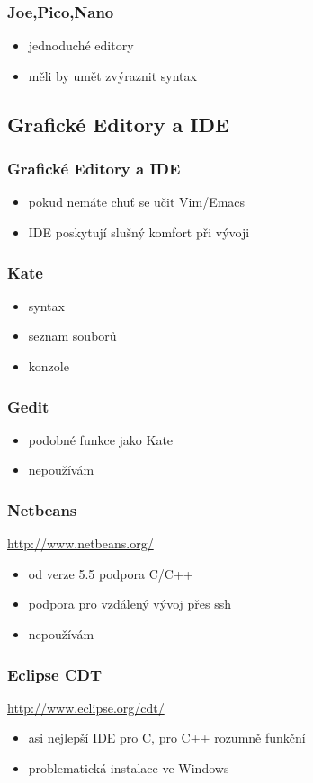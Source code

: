 \begin{frame}
	\frametitle{Joe,Pico,Nano}
	\begin{itemize}
		\item{jednoduché editory}
		\item{měli by umět zvýraznit syntax}
	\end{itemize}
\end{frame}

\subsection{Grafické Editory a IDE}

\begin{frame}
	\frametitle{Grafické Editory a IDE}
	\begin{itemize}
		\item{pokud nemáte chuť se učit Vim/Emacs}
		\item{IDE poskytují slušný komfort při vývoji}
	\end{itemize}
\end{frame}

\begin{frame}
	\frametitle{Kate}
	\begin{itemize}
		\item{syntax}
		\item{seznam souborů}
		\item{konzole}
	\end{itemize}
\end{frame}

\begin{frame}
	\frametitle{Gedit}
	\begin{itemize}
		\item{podobné funkce jako Kate}
		\item{nepoužívám}
	\end{itemize}
\end{frame}

\begin{frame}
	\frametitle{Netbeans}
	\href{http://www.netbeans.org/}{http://www.netbeans.org/}
	\begin{itemize}
		\item{od verze 5.5 podpora C/C++}
		\item{podpora pro vzdálený vývoj přes ssh}
		\item{nepoužívám}
	\end{itemize}
\end{frame}

\begin{frame}
	\frametitle{Eclipse CDT}
	\href{http://www.eclipse.org/cdt/}{http://www.eclipse.org/cdt/}
	\begin{itemize}
		\item{asi nejlepší IDE pro C, pro C++ rozumně funkční}
		\item{problematická instalace ve Windows}
	\end{itemize}
\end{frame}

